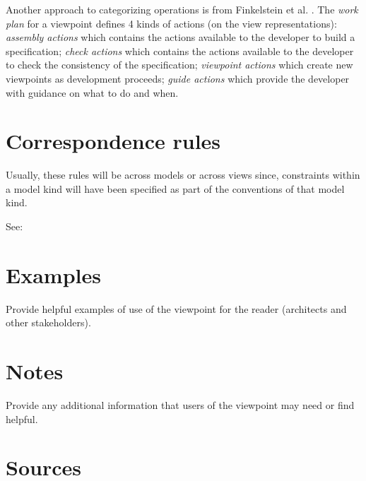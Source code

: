 Another approach to categorizing operations is from Finkelstein et
al. \cite{Finkelstein+1992}. The \emph{work plan} for a viewpoint
defines 4 kinds of actions (on the view representations):
\textit{assembly actions} which contains the actions available to the
developer to build a specification; \textit{check actions} which
contains the actions available to the developer to check the
consistency of the specification; \textit{viewpoint actions} which
create new viewpoints as development proceeds; \textit{guide actions}
which provide the developer with guidance on what to do and when.


\section{Correspondence rules}\label{CRs}


Usually, these rules will be across models or across views since,
constraints within a model kind will have been specified as part of
the conventions of that model kind.

See: 


\section{Examples \Optional} 

Provide helpful examples of use of the viewpoint for the reader
(architects and other stakeholders).


\section{Notes \Optional} 

Provide any additional information that users of the viewpoint may
need or find helpful.


\section{Sources} 


